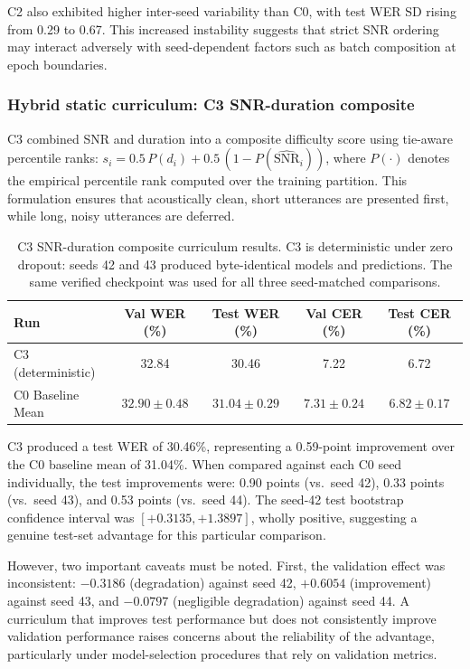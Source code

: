 C2 also exhibited higher inter-seed variability than C0, with test WER SD
rising from 0.29 to 0.67. This increased instability suggests that strict SNR
ordering may interact adversely with seed-dependent factors such as batch
composition at epoch boundaries.

\subsubsection{Hybrid static curriculum: C3 SNR-duration composite}

C3 combined SNR and duration into a composite difficulty score using
tie-aware percentile ranks: $s_i = 0.5\,P(d_i) + 0.5\,(1 - P(\widehat{\text{SNR}}_i))$,
where $P(\cdot)$ denotes the empirical percentile rank computed over the
training partition. This formulation ensures that acoustically clean, short
utterances are presented first, while long, noisy utterances are deferred.

\begin{table}[H]
\centering
\caption{C3 SNR-duration composite curriculum results. C3 is deterministic
under zero dropout: seeds 42 and 43 produced byte-identical models and
predictions. The same verified checkpoint was used for all three seed-matched
comparisons.}
\label{tab:c3-hybrid}
\begin{tabular}{lcccc}
\hline
\textbf{Run} & \textbf{Val WER (\%)} & \textbf{Test WER (\%)} & \textbf{Val CER (\%)} & \textbf{Test CER (\%)} \\
\hline
C3 (deterministic) & 32.84 & 30.46 & 7.22 & 6.72 \\
\hline
C0 Baseline Mean & $32.90 \pm 0.48$ & $31.04 \pm 0.29$ & $7.31 \pm 0.24$ & $6.82 \pm 0.17$ \\
\hline
\end{tabular}
\end{table}

C3 produced a test WER of 30.46\%, representing a 0.59-point improvement over
the C0 baseline mean of 31.04\%. When compared against each C0 seed
individually, the test improvements were: 0.90 points (vs.\ seed 42), 0.33
points (vs.\ seed 43), and 0.53 points (vs.\ seed 44). The seed-42 test
bootstrap confidence interval was $[+0.3135, +1.3897]$, wholly positive,
suggesting a genuine test-set advantage for this particular comparison.

However, two important caveats must be noted. First, the validation effect was
inconsistent: $-0.3186$ (degradation) against seed 42, $+0.6054$ (improvement)
against seed 43, and $-0.0797$ (negligible degradation) against seed 44. A
curriculum that improves test performance but does not consistently improve
validation performance raises concerns about the reliability of the advantage,
particularly under model-selection procedures that rely on validation metrics.

